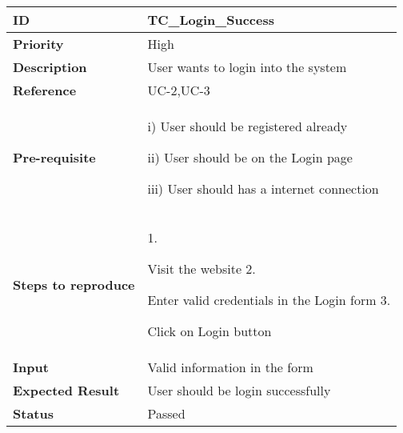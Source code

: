 \begin{center}
    \begin{tabularx}{\textwidth}{|l|X|}
        \hline
        \textbf{ID}                 & TC\_Login\_Success                   \\
        \hline
        \textbf{Priority}           & High                                 \\
        \hline
        \textbf{Description}        & User wants to login into the system  \\
        \hline
        \textbf{Reference}          & UC-2,UC-3                            \\
        \hline
        \textbf{Pre-requisite}      & i) User should be registered already

        ii) User should be on the Login page

        iii)  User should has a internet connection                        \\
        \hline
        \textbf{Steps to reproduce} & 1.

        Visit the website 2.

        Enter valid credentials in the Login form 3.

        Click on Login button                                              \\
        \hline
        \textbf{Input}              & Valid information in the form        \\
        \hline
        \textbf{Expected Result}    & User should be login successfully    \\
        \hline
        \textbf{Status}             & Passed                               \\
        \hline
    \end{tabularx}
\end{center}
\vspace{5mm}



